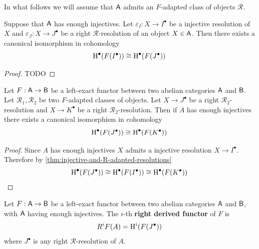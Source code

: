 \documentclass[../../../main]{subfiles}
\begin{document}
In what follows we will assume that \(\mathsf{A}\) admits an \(F\)-adapted class of objects \(\mathcal{R}\).

\begin{theorem}\label{thm:injective-and-R-adapted-resolutions}
  Suppose that \(\mathsf{A}\) has enough injectives.
  Let \(\varepsilon_{I}: X \to I^{\bullet}\) be a injective resolution of \(X\) and \(\varepsilon_{J}: X \to J^{\bullet}\) be a right \(\mathcal{R}\)-resolution of an object \(X \in \mathsf{A}\).
  Then there exists a canonical isomorphism in cohomology
  \begin{equation*}
    \operatorname{H}^{\bullet}(F(I^{\bullet})) \cong \operatorname{H}^{\bullet}(F(J^{\bullet}))
  \end{equation*}
\end{theorem}
\begin{proof}
  TODO
\end{proof}

\begin{corollary}
  Let \(F: \mathsf{A} \to \mathsf{B}\) be a left-exact functor between two abelian categories \(\mathsf{A}\) and \(\mathsf{B}\).
  Let \(\mathcal{R}_{1}, \mathcal{R}_{2}\) be two \(F\)-adapted classes of objects.
  Let \(X \to J^{\bullet}\) be a right \(\mathcal{R}_{2}\)-resolution and \(X \to K^{\bullet}\) be a right \(\mathcal{R}_{2}\)-resolution.
  Then if \(A\) has enough injectives there exists a canonical isomorphism in cohomology
  \begin{equation*}
    \operatorname{H}^{\bullet}(F(J^{\bullet})) \cong \operatorname{H}^{\bullet}(F(K^{\bullet}))
  \end{equation*}
\end{corollary}
\begin{proof}
  Since \(A\) has enough injectives \(X\) admits a injective resolution \(X \to I^{\bullet}\).
  Therefore by \autoref{thm:injective-and-R-adapted-resolutions}
  \begin{equation*}
    \operatorname{H}^{\bullet}(F(J^{\bullet})) \cong \operatorname{H}^{\bullet}(F(I^{\bullet})) \cong \operatorname{H}^{\bullet}(F(K^{\bullet}))
  \end{equation*}
\end{proof}

\begin{definition}
  Let \(F: \mathsf{A} \to \mathsf{B}\) be a left-exact functor between two abelian categories \(\mathsf{A}\) and \(\mathsf{B}\), with \(\mathsf{A}\) having enough injectives.
  The \(i\)-th \textbf{right derived functor} of \(F\) is
  \begin{equation*}
    R^{i}F(A) = \operatorname{H}^{i}(F(J^{\bullet}))
  \end{equation*}
  where \(J^{\bullet}\) is any right \(\mathcal{R}\)-resolution of \(A\).
\end{definition}
\end{document}
